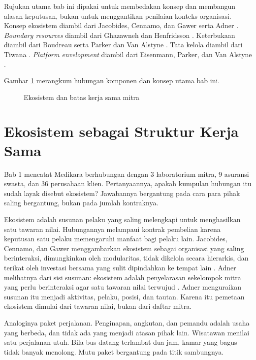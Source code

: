 Rujukan utama bab ini dipakai untuk membedakan konsep dan membangun alasan keputusan, bukan untuk
menggantikan penilaian konteks organisasi. Konsep ekosistem diambil dari Jacobides, Cennamo, dan
Gawer \cite{jacobides2018ecosystems} serta Adner \cite{c03-adner2017ecosystem}.
\textit{Boundary resources} diambil dari Ghazawneh dan Henfridsson \cite{ghazawneh2013boundary}.
Keterbukaan diambil dari Boudreau \cite{c03-boudreau2010open} serta Parker dan Van Alstyne
\cite{c03-parker2018innovation}. Tata kelola diambil dari Tiwana \cite{tiwana2014platform}.
\textit{Platform envelopment} diambil dari Eisenmann, Parker, dan Van Alstyne
\cite{eisenmann2011envelopment}.

Gambar \ref{fig:ch03-ilustrasi-bab} merangkum hubungan komponen dan konsep utama bab ini.
\begin{figure}[!htb]
  \centering
  
  \caption{Ekosistem dan batas kerja sama mitra}
  \label{fig:ch03-ilustrasi-bab}
\end{figure}

\section{Ekosistem sebagai Struktur Kerja Sama}

Bab 1 mencatat Medikara berhubungan dengan 3 laboratorium mitra, 9 asuransi swasta, dan 36
perusahaan klien. Pertanyaannya, apakah kumpulan hubungan itu sudah layak disebut ekosistem?
Jawabannya bergantung pada cara para pihak saling bergantung, bukan pada jumlah kontraknya.

Ekosistem adalah susunan pelaku yang saling melengkapi untuk menghasilkan satu tawaran nilai.
Hubungannya melampaui kontrak pembelian karena keputusan satu pelaku memengaruhi manfaat bagi
pelaku lain. Jacobides, Cennamo, dan Gawer menggambarkan ekosistem sebagai organisasi yang saling
berinteraksi, dimungkinkan oleh modularitas, tidak dikelola secara hierarkis, dan terikat oleh
investasi bersama yang sulit dipindahkan ke tempat lain \cite{jacobides2018ecosystems}. Adner
melihatnya dari sisi susunan: ekosistem adalah penyelarasan sekelompok mitra yang perlu
berinteraksi agar satu tawaran nilai terwujud \cite{c03-adner2017ecosystem}. Adner menguraikan
susunan itu menjadi aktivitas, pelaku, posisi, dan tautan. Karena itu pemetaan ekosistem dimulai
dari tawaran nilai, bukan dari daftar mitra.

Analoginya paket perjalanan. Penginapan, angkutan, dan pemandu adalah usaha yang berbeda, dan tidak
ada yang menjadi atasan pihak lain. Wisatawan menilai satu perjalanan utuh. Bila bus datang
terlambat dua jam, kamar yang bagus tidak banyak menolong. Mutu paket bergantung pada titik
sambungnya.

